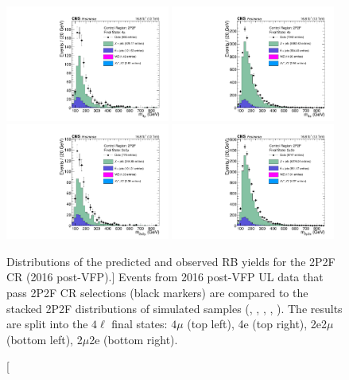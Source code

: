 \begin{figure}[!htbp]
	\begin{center}
		\includegraphics[width=0.48\textwidth]{figures/higgsmassmeas/redbkg/cr/UL2016postVFP_CR_2P2F_4mu.pdf}
		\includegraphics[width=0.48\textwidth]{figures/higgsmassmeas/redbkg/cr/UL2016postVFP_CR_2P2F_4e.pdf}
		\includegraphics[width=0.48\textwidth]{figures/higgsmassmeas/redbkg/cr/UL2016postVFP_CR_2P2F_2e2mu.pdf}
		\includegraphics[width=0.48\textwidth]{figures/higgsmassmeas/redbkg/cr/UL2016postVFP_CR_2P2F_2mu2e.pdf}
		\caption
			[Distributions of the predicted and observed RB yields for the 2P2F CR (2016 post-VFP).]
			{
			Events from 2016 post-VFP UL data that pass 2P2F CR selections (black markers) 
			are compared to the stacked 2P2F distributions of simulated samples
			(\Zplusjets, \ttbarplusjets, \WZ, \ZZ, \Zgammastar).
			The results are split into the $4\ell$ final states:
            $4\mu$ (top left), 4e (top right), 2e2$\mu$ (bottom left), 2$\mu$2e (bottom right).
			}
		\label{cr_plots_2p2f_2016postvfp}
	\end{center}
\end{figure}
